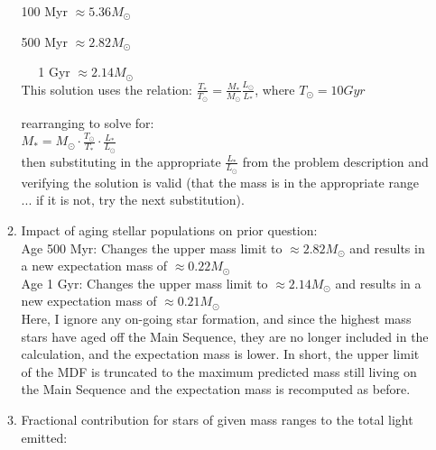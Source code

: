 \documentclass[11pt]{article}
\begin{document}
\begin{enumerate}
\begin{enumerate}
		   \hspace{10mm}100 Myr $\approx 5.36 M_{\odot}$ 
		   
		   \hspace{10mm}500 Myr $\approx 2.82 M_{\odot}$ 
		   
		   \hspace{10mm}~~  1 Gyr $\approx 2.14 M_{\odot}$\\
		  		  
		  
		  This solution uses the relation: $\frac{\displaystyle T_*}{\displaystyle T_{\odot}} = \frac{\displaystyle M_*}{\displaystyle M_{\odot}}\frac{\displaystyle L_{\odot}}{\displaystyle L_*}$, where $T_{\odot} = 10Gyr$
		  
		   rearranging to solve for:  \\
		  
		  \hspace{10mm} $M_* = M_{\odot} \cdot  \frac{\displaystyle T_{\odot}}{\displaystyle T_*} \cdot \frac{\displaystyle L_*}{\displaystyle L_{\odot}}$\\
		  
		then substituting in the appropriate $\frac{\displaystyle L_*}{\displaystyle L_{\odot}}$ from the problem description and verifying the solution is valid (that the mass is in the appropriate range ... if it is not, try the next substitution).\\
		  
		  
  	\item Impact of aging stellar populations on prior question:\\
  	
	  	Age 500 Myr: Changes the upper mass limit to $\approx 2.82 M_{\odot}$ and  results in a new expectation mass of $\approx 0.22 M_{\odot}$\\
	  	
	  	Age 1 Gyr: Changes the upper mass limit to $\approx 2.14 M_{\odot}$ and  results in a new expectation mass of $\approx 0.21 M_{\odot}$\\
	  	
		Here, I ignore any on-going star formation, and since the highest mass stars have aged off the Main Sequence, they are no longer included in the calculation, and the expectation mass is lower. In short, the upper limit of the MDF is truncated to the maximum predicted mass still living on the Main Sequence and the expectation mass is recomputed as before.\\
\newpage 
		
	\item Fractional contribution for stars of given mass ranges to the total light emitted:\\
	

\end{enumerate}
\end{enumerate}
\end{document}
